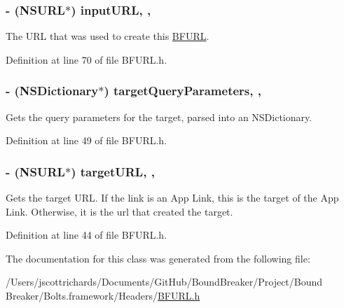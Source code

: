 \subsubsection[{input\+U\+R\+L}]{\setlength{\rightskip}{0pt plus 5cm}-\/ (N\+S\+U\+R\+L$\ast$) input\+U\+R\+L\hspace{0.3cm}{\ttfamily [read]}, {\ttfamily [nonatomic]}, {\ttfamily [strong]}}\label{interface_b_f_u_r_l_a588a05e6eaedf5f9b17ce0f85edbef20}
The U\+R\+L that was used to create this \hyperlink{interface_b_f_u_r_l}{B\+F\+U\+R\+L}. 

Definition at line 70 of file B\+F\+U\+R\+L.\+h.

\hypertarget{interface_b_f_u_r_l_a874bc9b6e197567616676e7c35882312}{}
\subsubsection[{target\+Query\+Parameters}]{\setlength{\rightskip}{0pt plus 5cm}-\/ (N\+S\+Dictionary$\ast$) target\+Query\+Parameters\hspace{0.3cm}{\ttfamily [read]}, {\ttfamily [nonatomic]}, {\ttfamily [strong]}}\label{interface_b_f_u_r_l_a874bc9b6e197567616676e7c35882312}
Gets the query parameters for the target, parsed into an N\+S\+Dictionary. 

Definition at line 49 of file B\+F\+U\+R\+L.\+h.

\hypertarget{interface_b_f_u_r_l_aa83698fb8e97cde89f07f2a27dd453b9}{}
\subsubsection[{target\+U\+R\+L}]{\setlength{\rightskip}{0pt plus 5cm}-\/ (N\+S\+U\+R\+L$\ast$) target\+U\+R\+L\hspace{0.3cm}{\ttfamily [read]}, {\ttfamily [nonatomic]}, {\ttfamily [strong]}}\label{interface_b_f_u_r_l_aa83698fb8e97cde89f07f2a27dd453b9}
Gets the target U\+R\+L. If the link is an App Link, this is the target of the App Link. Otherwise, it is the url that created the target. 

Definition at line 44 of file B\+F\+U\+R\+L.\+h.



The documentation for this class was generated from the following file\+:\begin{DoxyCompactItemize}
\item 
/\+Users/jscottrichards/\+Documents/\+Git\+Hub/\+Bound\+Breaker/\+Project/\+Bound Breaker/\+Bolts.\+framework/\+Headers/\hyperlink{_b_f_u_r_l_8h}{B\+F\+U\+R\+L.\+h}\end{DoxyCompactItemize}

